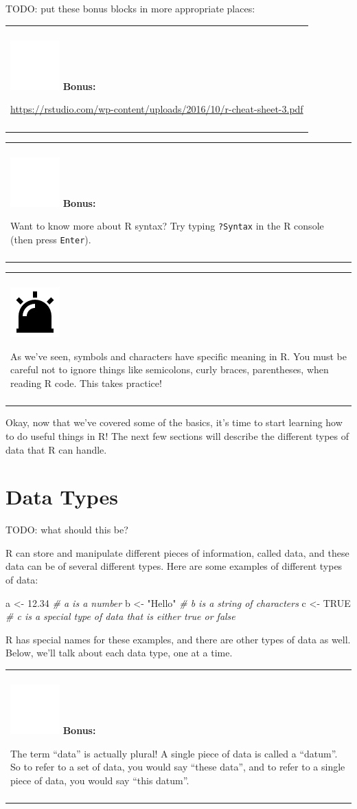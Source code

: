 \documentclass[
]{book}
\newenvironment{Shaded}{\begin{snugshade}}{\end{snugshade}}
\newcommand{\CommentTok}[1]{\textcolor[rgb]{0.56,0.35,0.01}{\textit{#1}}}
\newcommand{\FloatTok}[1]{\textcolor[rgb]{0.00,0.00,0.81}{#1}}
\newcommand{\NormalTok}[1]{#1}
\newcommand{\OtherTok}[1]{\textcolor[rgb]{0.56,0.35,0.01}{#1}}
\newcommand{\StringTok}[1]{\textcolor[rgb]{0.31,0.60,0.02}{#1}}
\newenvironment{bonus}
{
  \begin{center}
  \begin{tabular}{|>{\columncolor{bonus}\color{white}}p{0.9\textwidth}|}\hline\\
  \includegraphics[scale=0.1]{src/images/sun-fill-invert.png}
  \textbf{Bonus:}
}
{\\\\\hline
  \end{tabular}
  \end{center}
}
\newenvironment{caution}
{
  \begin{center}
  \begin{tabular}{|>{\columncolor{caution}}p{0.9\textwidth}|}
  \hline\\
  \includegraphics[scale=0.1]{src/images/alarm-warning-fill.png}
}
{\\\\\hline
  \end{tabular}
  \end{center}
}
\begin{document}
TODO: put these bonus blocks in more appropriate places:

\begin{bonus}
\url{https://rstudio.com/wp-content/uploads/2016/10/r-cheat-sheet-3.pdf}
\end{bonus}
\begin{bonus}
Want to know more about R syntax? Try typing \texttt{?Syntax} in the R
console (then press \texttt{Enter}).
\end{bonus}

\begin{caution}
As we've seen, symbols and characters have specific meaning in R. You
must be careful not to ignore things like semicolons, curly braces,
parentheses, when reading R code. This takes practice!
\end{caution}

Okay, now that we've covered some of the basics, it's time to start learning how to do useful things in R!
The next few sections will describe the different types of data that R can handle.

\hypertarget{data-types}{%
\section{Data Types}\label{data-types}}

\begin{reflection}
TODO: what should this be?
\end{reflection}

R can store and manipulate different pieces of information, called data, and these data can be of several different types.
Here are some examples of different types of data:

\begin{Shaded}
\begin{Highlighting}[]
\NormalTok{a <-}\StringTok{ }\FloatTok{12.34}      \CommentTok{# a is a number}
\NormalTok{b <-}\StringTok{ "Hello"}    \CommentTok{# b is a string of characters}
\NormalTok{c <-}\StringTok{ }\OtherTok{TRUE}       \CommentTok{# c is a special type of data that is either true or false}
\end{Highlighting}
\end{Shaded}

R has special names for these examples, and there are other types of data as well.
Below, we'll talk about each data type, one at a time.

\begin{bonus}
The term ``data'' is actually plural! A single piece of data is called a
``datum''. So to refer to a set of data, you would say ``these data'',
and to refer to a single piece of data, you would say ``this datum''.
\end{bonus}
\end{document}
